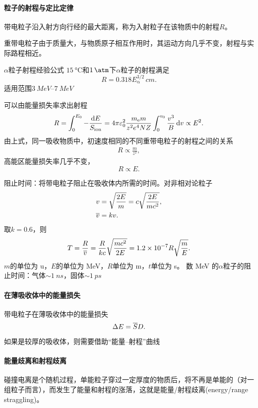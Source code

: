\paragraph{粒子的射程与定比定律}带电粒子沿入射方向行经的最大距离，称为入射粒子在该物质中的射程$R$。

重带电粒子由于质量大，与物质原子相互作用时，其运动方向几乎不变，射程与实际路程相近。

\begin{example}{$\alpha$粒子射程经验公式}{}
	$\qty{15}{\degreeCelsius}$和$\qty{1}{\atm}$下$\alpha$粒子的射程满足
	\begin{equation}\label{eq:nrd-alpha-air-range}
		R = 0.318E_\upalpha^{3/2}\,\unit{cm}.
	\end{equation}
	适用范围$\qtyrange{3}{7}{MeV}$
\end{example}
可以由能量损失率求出射程
\begin{align}
	R = \int_0^{E_0} - \frac{\mathop{}\!\mathrm{d} E}{S_{\mathrm{ion}}} = 4\pi\varepsilon_0^2\frac{m_{\mathrm{e}} m}{z^2e^4NZ}\int_0^{v_0}\frac{v^3}B\mathop{}\!\mathrm{d} v \propto E^2.
\end{align}
由上式，同一吸收物质中，初速度相同的不同重带电粒子的射程之间的关系
\begin{align}
	R \propto \frac{m}{z^2},%
\end{align}
高能区能量损失率几乎不变，
\[
	R \propto E.
\]



阻止时间：将带电粒子阻止在吸收体内所需的时间。对非相对论粒子
\begin{align*}
	v &= \sqrt{\frac{2E}{m}} = c\sqrt{\frac{2E}{mc^2}},\\
	\overline{v} &= kv.
\end{align*}
取$k = 0.6$，则
\begin{equation}\label{eq:nrd-stopping-time}
	T = \frac{R}{\overline{v}} = \frac{R}{kc}\sqrt{\frac{mc^2}{2E}} = \num{1.2e-7}R\sqrt{\frac{m}E}.
\end{equation}
$m$的单位为 \unit{u}，$E$的单位为 \unit{MeV}，$R$单位为 \unit{m}，$t$单位为 \unit{s}。
数 \unit{MeV} 的$\alpha$粒子的阻止时间：气体$\sim \qty{1}{ns}$，固体$\sim \qty{1}{ps}$
\paragraph{在薄吸收体中的能量损失}
带电粒子在薄吸收体中的能量损失
\[
	\Delta E = \overline{S}D.
\]
如果是较厚的吸收体，则需要借助“能量--射程”曲线
\paragraph{能量歧离和射程歧离}
碰撞电离是个随机过程，单能粒子穿过一定厚度的物质后，将不再是单能的（对一组粒子而言），而发生了能量和射程的涨落，这就是能量/射程歧离(energy/range straggling)。
